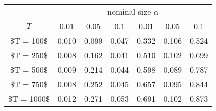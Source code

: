 % 
\begin{tabular}{ccccccc}
  \hline
  & \multicolumn{6}{c}{nominal size $\alpha$} \\
 $T$ & 0.01 & 0.05 & 0.1 & 0.01 & 0.05 & 0.1 \\
 \hline
\$T = 100\$ & 0.010 & 0.099 & 0.047 & 0.332 & 0.106 & 0.524 \\ 
  \$T = 250\$ & 0.008 & 0.162 & 0.041 & 0.510 & 0.102 & 0.699 \\ 
  \$T = 500\$ & 0.009 & 0.214 & 0.044 & 0.598 & 0.089 & 0.787 \\ 
  \$T = 750\$ & 0.008 & 0.252 & 0.045 & 0.657 & 0.095 & 0.844 \\ 
  \$T = 1000\$ & 0.012 & 0.271 & 0.053 & 0.691 & 0.102 & 0.873 \\ 
   \hline
\end{tabular}
